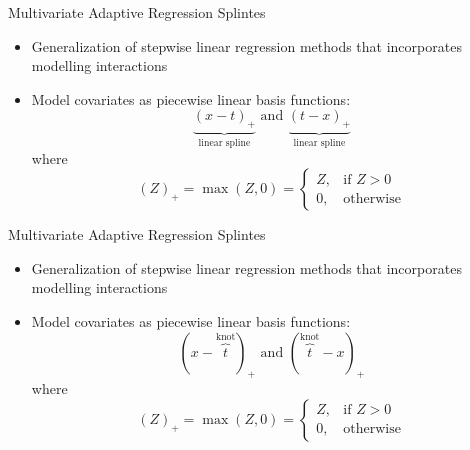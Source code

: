\documentclass[handout]{beamer}
\begin{document}
\begin{frame}{Multivariate Adaptive Regression Splintes}
  \begin{itemize}
    \item Generalization of stepwise linear regression methods that incorporates modelling interactions
    \item Model covariates as piecewise linear basis functions:
  \begin{equation*} \label{eq:bases}
    \underbrace{(x - t)_{+}}_\text{linear spline} \text{ and } \underbrace{(t - x)_{+}}_\text{linear spline}
  \end{equation*} where
  \begin{equation*}
    (Z)_{+} = \max(Z, 0) = \begin{cases}
    Z, & \text{if } Z > 0 \\
    0, & \text{otherwise}
    \end{cases}
  \end{equation*}
  \end{itemize}
\end{frame}


\begin{frame}{Multivariate Adaptive Regression Splintes}
  \begin{itemize}
    \item Generalization of stepwise linear regression methods that incorporates modelling interactions
    \item Model covariates as piecewise linear basis functions:
  \begin{equation*} \label{eq:bases}
    (x - \overbrace{t}^\text{knot})_{+} \text{ and } (\overbrace{t}^\text{knot} - x)_{+}
  \end{equation*} where
  \begin{equation*}
    (Z)_{+} = \max(Z, 0) = \begin{cases}
    Z, & \text{if } Z > 0 \\
    0, & \text{otherwise}
    \end{cases}
  \end{equation*}
  \end{itemize}
\end{frame}
\end{document}
